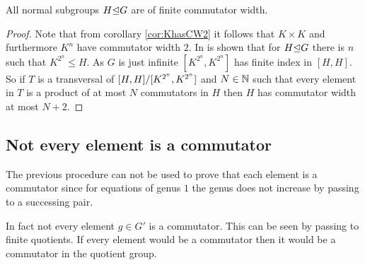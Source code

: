 \documentclass[a4paper,11pt]{amsart}
\begin{document}
\begin{cor}
 All normal subgroups $H{\mathrel\trianglelefteq} G$ are of finite commutator width.
\end{cor}
\begin{proof}
 Note that from corollary \ref{cor:KhasCW2} it follows that $K\times K$ and furthermore $K^n$ have commutator width $2$. 
 In %
 is shown that for $H{\mathrel\trianglelefteq} G$ there is $n$ such that $K^{2^n}\leq H$. As $G$ is just infinite $[K^{2^n},K^{2^n}]$ has finite index in $[H,H]$.
 So if $T$ is a transversal of ${[H,H]/[K^{2^n},K^{2^n}]}$ and $N\in \mathbb{N}$ such that every element in $T$ is a product of at most $N$ commutators
 in $H$ then $H$ has commutator width at most $N+2$.
\end{proof}
\subsection{Not every element is a commutator}
The previous procedure can not be used to prove that each element is a commutator since for equations of genus $1$ the 
genus does not increase by passing to a successing pair. 

In fact not every element $g\in G'$ is a commutator. This can be seen by passing to finite quotients. If every element would be a commutator then
it would be a commutator in the quotient group. 
\end{document}
